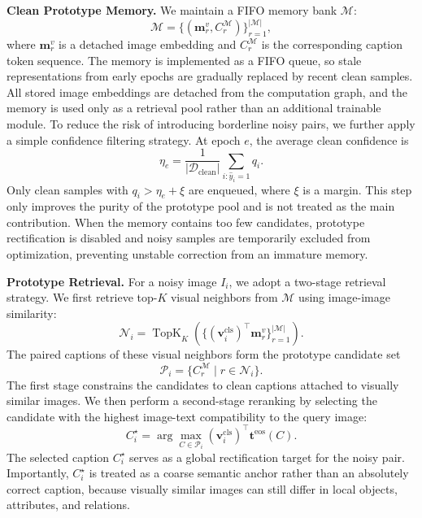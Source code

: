 \noindent\textbf{Clean Prototype Memory.}
We maintain a FIFO memory bank $\mathcal{M}$:
\begin{equation}
    \mathcal{M}=
    \{(\boldsymbol{m}^{v}_{r}, C^{\mathcal{M}}_{r})\}_{r=1}^{|\mathcal{M}|},
\end{equation}
where $\boldsymbol{m}^{v}_{r}$ is a detached image embedding and $C^{\mathcal{M}}_{r}$ is the corresponding caption token sequence. The memory is implemented as a FIFO queue, so stale representations from early epochs are gradually replaced by recent clean samples. All stored image embeddings are detached from the computation graph, and the memory is used only as a retrieval pool rather than an additional trainable module. To reduce the risk of introducing borderline noisy pairs, we further apply a simple confidence filtering strategy. At epoch $e$, the average clean confidence is
\begin{equation}
    \eta_e=
    \frac{1}{|\mathcal{D}_{\mathrm{clean}}|}
    \sum_{i:\hat{y}_i=1}q_i.
\end{equation}
Only clean samples with $q_i>\eta_e+\xi$ are enqueued, where $\xi$ is a margin. This step only improves the purity of the prototype pool and is not treated as the main contribution. When the memory contains too few candidates, prototype rectification is disabled and noisy samples are temporarily excluded from optimization, preventing unstable correction from an immature memory.

\noindent\textbf{Prototype Retrieval.}
For a noisy image $I_i$, we adopt a two-stage retrieval strategy. We first retrieve top-$K$ visual neighbors from $\mathcal{M}$ using image-image similarity:
\begin{equation}
    \mathcal{N}_i=
    \operatorname{TopK}_{K}
    \left(
    \{(\boldsymbol{v}_{i}^{\mathrm{cls}})^{\top}\boldsymbol{m}^{v}_{r}\}_{r=1}^{|\mathcal{M}|}
    \right).
\end{equation}
The paired captions of these visual neighbors form the prototype candidate set
\begin{equation}
    \mathcal{P}_i=\{C^{\mathcal{M}}_{r}\mid r\in\mathcal{N}_i\}.
\end{equation}
The first stage constrains the candidates to clean captions attached to visually similar images. We then perform a second-stage reranking by selecting the candidate with the highest image-text compatibility to the query image:
\begin{equation}
    C_i^{\star}
    =
    \arg\max_{C\in\mathcal{P}_i}
    (\boldsymbol{v}_{i}^{\mathrm{cls}})^{\top}
    \boldsymbol{t}^{\mathrm{eos}}(C).
\end{equation}
The selected caption $C_i^{\star}$ serves as a global rectification target for the noisy pair. Importantly, $C_i^{\star}$ is treated as a coarse semantic anchor rather than an absolutely correct caption, because visually similar images can still differ in local objects, attributes, and relations.

